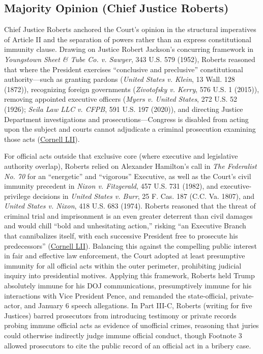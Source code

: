 \documentclass[12pt]{article}
\begin{document}
\subsection{Majority Opinion (Chief Justice Roberts)}

Chief Justice Roberts anchored the Court's opinion in the structural imperatives of Article II and the separation of powers rather than an express constitutional immunity clause. Drawing on Justice Robert Jackson's concurring framework in \textit{Youngstown Sheet \& Tube Co. v. Sawyer}, 343 U.S. 579 (1952), Roberts reasoned that where the President exercises ``conclusive and preclusive'' constitutional authority---such as granting pardons (\textit{United States v. Klein}, 13 Wall. 128 (1872)), recognizing foreign governments (\textit{Zivotofsky v. Kerry}, 576 U.S. 1 (2015)), removing appointed executive officers (\textit{Myers v. United States}, 272 U.S. 52 (1926); \textit{Seila Law LLC v. CFPB}, 591 U.S. 197 (2020)), and directing Justice Department investigations and prosecutions---Congress is disabled from acting upon the subject and courts cannot adjudicate a criminal prosecution examining those acts (\href{https://www.law.cornell.edu/supremecourt/text/23-939}{Cornell LII}).

For official acts outside that exclusive core (where executive and legislative authority overlap), Roberts relied on Alexander Hamilton's call in \textit{The Federalist No. 70} for an ``energetic'' and ``vigorous'' Executive, as well as the Court's civil immunity precedent in \textit{Nixon v. Fitzgerald}, 457 U.S. 731 (1982), and executive-privilege decisions in \textit{United States v. Burr}, 25 F. Cas. 187 (C.C. Va. 1807), and \textit{United States v. Nixon}, 418 U.S. 683 (1974). Roberts reasoned that the threat of criminal trial and imprisonment is an even greater deterrent than civil damages and would chill ``bold and unhesitating action,'' risking ``an Executive Branch that cannibalizes itself, with each successive President free to prosecute his predecessors'' (\href{https://www.law.cornell.edu/supremecourt/text/23-939}{Cornell LII}). Balancing this against the compelling public interest in fair and effective law enforcement, the Court adopted at least presumptive immunity for all official acts within the outer perimeter, prohibiting judicial inquiry into presidential motives. Applying this framework, Roberts held Trump absolutely immune for his DOJ communications, presumptively immune for his interactions with Vice President Pence, and remanded the state-official, private-actor, and January 6 speech allegations. In Part III-C, Roberts (writing for five Justices) barred prosecutors from introducing testimony or private records probing immune official acts as evidence of unofficial crimes, reasoning that juries could otherwise indirectly judge immune official conduct, though Footnote 3 allowed prosecutors to cite the public record of an official act in a bribery case.
\end{document}
